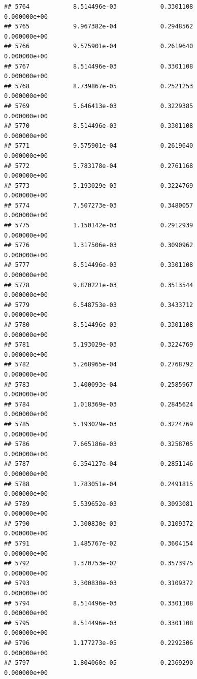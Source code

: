 \documentclass[
]{article}
\begin{document}
\begin{verbatim}
## 5764            8.514496e-03            0.3301108            0.000000e+00
## 5765            9.967382e-04            0.2948562            0.000000e+00
## 5766            9.575901e-04            0.2619640            0.000000e+00
## 5767            8.514496e-03            0.3301108            0.000000e+00
## 5768            8.739867e-05            0.2521253            0.000000e+00
## 5769            5.646413e-03            0.3229385            0.000000e+00
## 5770            8.514496e-03            0.3301108            0.000000e+00
## 5771            9.575901e-04            0.2619640            0.000000e+00
## 5772            5.783178e-04            0.2761168            0.000000e+00
## 5773            5.193029e-03            0.3224769            0.000000e+00
## 5774            7.507273e-03            0.3480057            0.000000e+00
## 5775            1.150142e-03            0.2912939            0.000000e+00
## 5776            1.317506e-03            0.3090962            0.000000e+00
## 5777            8.514496e-03            0.3301108            0.000000e+00
## 5778            9.870221e-03            0.3513544            0.000000e+00
## 5779            6.548753e-03            0.3433712            0.000000e+00
## 5780            8.514496e-03            0.3301108            0.000000e+00
## 5781            5.193029e-03            0.3224769            0.000000e+00
## 5782            5.268965e-04            0.2768792            0.000000e+00
## 5783            3.400093e-04            0.2585967            0.000000e+00
## 5784            1.018369e-03            0.2845624            0.000000e+00
## 5785            5.193029e-03            0.3224769            0.000000e+00
## 5786            7.665186e-03            0.3258705            0.000000e+00
## 5787            6.354127e-04            0.2851146            0.000000e+00
## 5788            1.783051e-04            0.2491815            0.000000e+00
## 5789            5.539652e-03            0.3093081            0.000000e+00
## 5790            3.300830e-03            0.3109372            0.000000e+00
## 5791            1.485767e-02            0.3604154            0.000000e+00
## 5792            1.370753e-02            0.3573975            0.000000e+00
## 5793            3.300830e-03            0.3109372            0.000000e+00
## 5794            8.514496e-03            0.3301108            0.000000e+00
## 5795            8.514496e-03            0.3301108            0.000000e+00
## 5796            1.177273e-05            0.2292506            0.000000e+00
## 5797            1.804060e-05            0.2369290            0.000000e+00

\end{verbatim}
\end{document}
